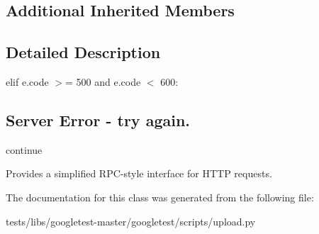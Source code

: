 \subsection*{Additional Inherited Members}


\subsection{Detailed Description}
elif e.\+code $>$= 500 and e.\+code $<$ 600\+: \subsection*{Server Error -\/ try again.}

continue \begin{DoxyVerb}Provides a simplified RPC-style interface for HTTP requests.\end{DoxyVerb}
 

The documentation for this class was generated from the following file\+:\begin{DoxyCompactItemize}
\item 
tests/libs/googletest-\/master/googletest/scripts/upload.\+py\end{DoxyCompactItemize}

